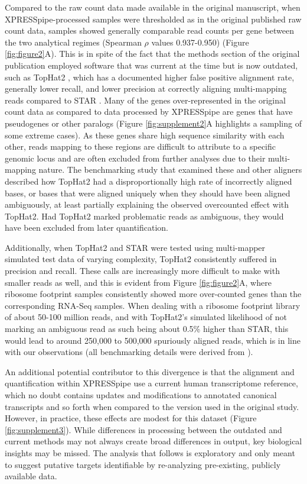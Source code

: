 \documentclass[10pt, oneside]{article}
\begin{document}
Compared to the raw count data made available in the original manuscript, when XPRESSpipe-processed samples were thresholded as in the original published raw count data, samples showed generally comparable read counts per gene between the two analytical regimes (Spearman $\rho$ values 0.937-0.950) (Figure \ref{fig:figure2}A). This is in spite of the fact that the methods section of the original publication employed software that was current at the time but is now outdated, such as TopHat2 \cite{tophat2}, which has a documented higher false positive alignment rate, generally lower recall, and lower precision at correctly aligning multi-mapping reads compared to STAR \cite{alignment_benchmark, star}. Many of the genes over-represented in the original count data as compared to data processed by XPRESSpipe are genes that have pseudogenes or other paralogs (Figure \ref{fig:supplement2}A highlights a sampling of some extreme cases). As these genes share high sequence similarity with each other, reads mapping to these regions are difficult to attribute to a specific genomic locus and are often excluded from further analyses due to their multi-mapping nature. The benchmarking study \cite{alignment_benchmark} that examined these and other aligners described how TopHat2 had a disproportionally high rate of incorrectly aligned bases, or bases that were aligned uniquely when they should have been aligned ambiguously, at least partially explaining the observed overcounted effect with TopHat2. Had TopHat2 marked problematic reads as ambiguous, they would have been excluded from later quantification. \par

Additionally, when TopHat2 and STAR were tested using multi-mapper simulated test data of varying complexity, TopHat2 consistently suffered in precision and recall. These calls are increasingly more difficult to make with smaller reads as well, and this is evident from Figure \ref{fig:figure2}A, where ribosome footprint samples consistently showed more over-counted genes than the corresponding RNA-Seq samples. When dealing with a ribosome footprint library of about 50-100 million reads, and with TopHat2's simulated likelihood of not marking an ambiguous read as such being about 0.5\% higher than STAR, this would lead to around 250,000 to 500,000 spuriously aligned reads, which is in line with our observations (all benchmarking details were derived from \cite{alignment_benchmark}). \par

An additional potential contributor to this divergence is that the alignment and quantification within XPRESSpipe use a current human transcriptome reference, which no doubt contains updates and modifications to annotated canonical transcripts and so forth when compared to the version used in the original study. However, in practice, these effects are modest for this dataset (Figure \ref{fig:supplement3}). While differences in processing between the outdated and current methods may not always create broad differences in output, key biological insights may be missed. The analysis that follows is exploratory and only meant to suggest putative targets identifiable by re-analyzing pre-existing, publicly available data. \par
\end{document}

